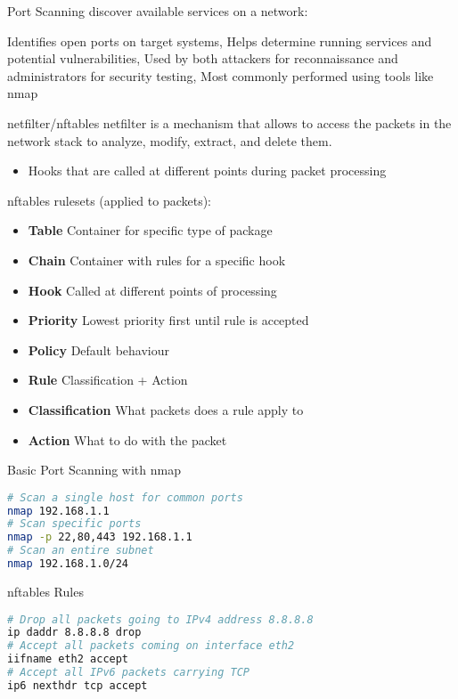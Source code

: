 
\begin{definition}{Port Scanning}
discover available services on a network:

Identifies open ports on target systems,
Helps determine running services and potential vulnerabilities,
Used by both attackers for reconnaissance and administrators for security testing,
Most commonly performed using tools like nmap

\end{definition}

\begin{definition}{netfilter/nftables}
    netfilter is a mechanism that allows to access the packets in the network stack to analyze, modify, extract, and delete them.
    \begin{itemize}
        \item Hooks that are called at different points during packet processing
    \end{itemize}
    
    nftables rulesets (applied to packets):
    \begin{itemize}
        \item \textbf{Table} Container for specific type of package
        \item \textbf{Chain} Container with rules for a specific hook
        \item \textbf{Hook} Called at different points of processing
        \item \textbf{Priority} Lowest priority first until rule is accepted
        \item \textbf{Policy} Default behaviour
        \item \textbf{Rule} Classification + Action
        \item \textbf{Classification} What packets does a rule apply to
        \item \textbf{Action} What to do with the packet
    \end{itemize}
\end{definition}

\begin{examplecode}{Basic Port Scanning with nmap}
\begin{lstlisting}[language=bash, style=basesmolll]
# Scan a single host for common ports
nmap 192.168.1.1
# Scan specific ports
nmap -p 22,80,443 192.168.1.1
# Scan an entire subnet
nmap 192.168.1.0/24
\end{lstlisting}
\end{examplecode}

\begin{examplecode}{nftables Rules}
\begin{lstlisting}[language=bash, style=basesmolll]
# Drop all packets going to IPv4 address 8.8.8.8
ip daddr 8.8.8.8 drop
# Accept all packets coming on interface eth2
iifname eth2 accept
# Accept all IPv6 packets carrying TCP
ip6 nexthdr tcp accept
\end{lstlisting}
\end{examplecode}



\multend
